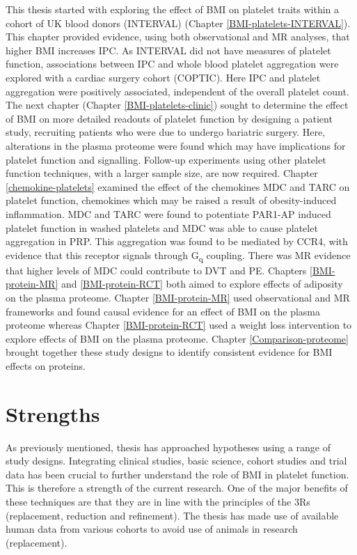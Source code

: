\documentclass[11pt,twoside]{bristolthesis}
\begin{document}
This thesis started with exploring the effect of BMI on platelet traits within a cohort of UK blood donors (INTERVAL) (Chapter \ref{BMI-platelets-INTERVAL}). This chapter provided evidence, using both observational and MR analyses, that higher BMI increases IPC. As INTERVAL did not have measures of platelet function, associations between IPC and whole blood platelet aggregation were explored with a cardiac surgery cohort (COPTIC). Here IPC and platelet aggregation were positively associated, independent of the overall platelet count. The next chapter (Chapter \ref{BMI-platelets-clinic}) sought to determine the effect of BMI on more detailed readouts of platelet function by designing a patient study, recruiting patients who were due to undergo bariatric surgery. Here, alterations in the plasma proteome were found which may have implications for platelet function and signalling. Follow-up experiments using other platelet function techniques, with a larger sample size, are now required. Chapter \ref{chemokine-platelets} examined the effect of the chemokines MDC and TARC on platelet function, chemokines which may be raised a result of obesity-induced inflammation. MDC and TARC were found to potentiate PAR1-AP induced platelet function in washed platelets and MDC was able to cause platelet aggregation in PRP. This aggregation was found to be mediated by CCR4, with evidence that this receptor signals through G\textsubscript{q} coupling. There was MR evidence that higher levels of MDC could contribute to DVT and PE. Chapters \ref{BMI-protein-MR} and \ref{BMI-protein-RCT} both aimed to explore effects of adiposity on the plasma proteome. Chapter \ref{BMI-protein-MR} used observational and MR frameworks and found causal evidence for an effect of BMI on the plasma proteome whereas Chapter \ref{BMI-protein-RCT} used a weight loss intervention to explore effects of BMI on the plasma proteome. Chapter \ref{Comparison-proteome} brought together these study designs to identify consistent evidence for BMI effects on proteins.

\hypertarget{strengths}{%
\section{Strengths}\label{strengths}}

As previously mentioned, thesis has approached hypotheses using a range of study designs. Integrating clinical studies, basic science, cohort studies and trial data has been crucial to further understand the role of BMI in platelet function. This is therefore a strength of the current research. One of the major benefits of these techniques are that they are in line with the principles of the 3Rs (replacement, reduction and refinement). The thesis has made use of available human data from various cohorts to avoid use of animals in research (replacement).
\end{document}
